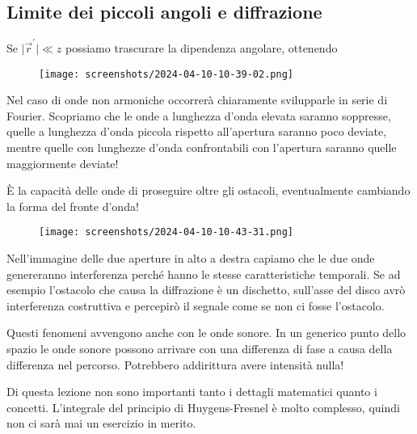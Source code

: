 \subsection{Limite dei piccoli angoli e diffrazione}
Se \(\vert \vec{r}^{\prime}  \vert \ll z \) possiamo trascurare la dipendenza angolare, ottenendo
\begin{figure}[H]
	\centering
	\texttt{[image: screenshots/2024-04-10-10-39-02.png]}
\end{figure}
Nel caso di onde non armoniche occorrerà chiaramente svilupparle in serie di Fourier. Scopriamo che le onde a lunghezza d'onda elevata saranno soppresse, quelle a lunghezza d'onda piccola rispetto all'apertura saranno poco deviate, mentre quelle con lunghezze d'onda confrontabili con l'apertura saranno quelle maggiormente deviate!

È la capacità delle onde di proseguire oltre gli ostacoli, eventualmente cambiando la forma del fronte d'onda!
\begin{figure}[H]
	\centering
	\texttt{[image: screenshots/2024-04-10-10-43-31.png]}
\end{figure}
Nell'immagine delle due aperture in alto a destra capiamo che le due onde genereranno interferenza perché hanno le stesse caratteristiche temporali.
Se ad esempio l'ostacolo che causa la diffrazione è un dischetto, sull'asse del disco avrò interferenza costruttiva e percepirò il segnale come se non ci fosse l'ostacolo.

Questi fenomeni avvengono anche con le onde sonore. In un generico punto dello spazio le onde sonore possono arrivare con una differenza di fase a causa della differenza nel percorso. Potrebbero addirittura avere intensità nulla!

\begin{note}
	Di questa lezione non sono importanti tanto i dettagli matematici quanto i concetti. L'integrale del principio di Huygens-Fresnel è molto complesso, quindi non ci sarà mai un esercizio in merito.
\end{note}